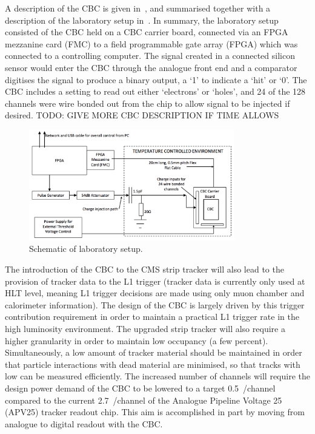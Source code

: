 A description of the CBC is given in~\cite{JonesL}, and summarised together with a description of the
laboratory setup in~\cite{JacobJA}. In summary, the laboratory setup consisted of the CBC held on a CBC
carrier board, connected via an FPGA mezzanine card (FMC) to a field programmable gate array (FPGA) which was
connected to a controlling computer. The signal created in a connected silicon sensor would enter
the CBC through the analogue front end and a comparator digitises the signal to produce a binary output, a `1'
to indicate a `hit' or `0'. The CBC includes a setting to read out either `electrons' or `holes', and 24 of
the 128 channels were wire bonded out from the chip to allow signal to be injected if desired. TODO: GIVE
MORE CBC DESCRIPTION IF TIME ALLOWS %

\begin{figure}[ht] %
   \centering
     \includegraphics[width=0.8\textwidth]{Chapters/07_Appendices/07c_2_Images/lab_setup_schematic}\hfill
     \caption{Schematic of laboratory setup.}
     \label{fig:lab_setup_schematic}
\end{figure}

The introduction of the CBC to the CMS strip tracker will also lead to the provision of tracker data to the L1
trigger (tracker data is currently only used at HLT level, meaning L1 trigger decisions are made using only
muon chamber and calorimeter information). The design of the CBC is largely driven by this trigger
contribution requirement in order to maintain a practical L1 trigger rate in the high luminosity environment.
The upgraded strip tracker will also require a higher granularity in order to maintain low occupancy (a few
percent). Simultaneously, a low amount of tracker material should be maintained in order that particle
interactions with dead material are minimised, so that tracks with low \pt can be measured efficiently. The
increased number of channels will require the design power demand of the CBC to be lowered to a target
0.5~\mW/channel~\cite{JonesL,Ferguson:2012cg,Raymond:2012zz} compared to the current 2.7~\mW/channel of
the Analogue Pipeline Voltage 25 (APV25) tracker readout chip. This aim is accomplished in part by moving
from analogue to digital readout with the CBC.

